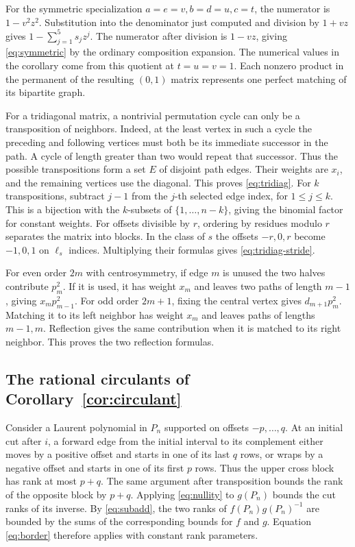 \documentclass[11pt,reqno]{amsart}
\theoremstyle{remark}
\numberwithin{equation}{section}
\begin{document}
For the symmetric specialization \(a=e=v,b=d=u,c=t\), the numerator is
\(1-v^2z^2\). Substitution into the denominator just computed and
division by \(1+vz\) gives \(1-\sum_{j=1}^5s_jz^j\). The numerator after
division is \(1-vz\), giving \eqref{eq:symmetric} by the ordinary
composition expansion. The numerical values in the corollary come from
this quotient at \(t=u=v=1\). Each nonzero product in the permanent of
the resulting \((0,1)\) matrix represents one perfect matching of its
bipartite graph.

For a tridiagonal matrix, a nontrivial permutation cycle can only be a
transposition of neighbors. Indeed, at the least vertex in such a cycle
the preceding and following vertices must both be its immediate successor
in the path. A cycle of length greater than two would repeat that
successor. Thus the possible transpositions form a set \(E\) of disjoint
path edges. Their weights are \(x_i\), and the remaining vertices use the
diagonal. This proves \eqref{eq:tridiag}. For \(k\) transpositions,
subtract \(j-1\) from the \(j\)-th selected edge index, for \(1\le j\le
k\). This is a bijection with the \(k\)-subsets of \(\{1,\ldots,n-k\}\),
giving the binomial factor for constant weights. For offsets divisible by
\(r\), ordering by residues modulo \(r\) separates the matrix into
blocks. In the class of \(s\) the offsets \(-r,0,r\) become \(-1,0,1\) on
\(\ell_s\) indices. Multiplying their formulas gives
\eqref{eq:tridiag-stride}.

For even order \(2m\) with centrosymmetry, if edge \(m\) is unused the
two halves contribute \(p_m^2\). If it is used, it has weight \(x_m\) and
leaves two paths of length \(m-1\), giving \(x_mp_{m-1}^2\). For odd
order \(2m+1\), fixing the central vertex gives \(d_{m+1}p_m^2\).
Matching it to its left neighbor has weight \(x_m\) and leaves paths of
lengths \(m-1,m\). Reflection gives the same contribution when it is
matched to its right neighbor. This proves the two reflection formulas.

\subsection{The rational circulants of Corollary~\ref{cor:circulant}}

Consider a Laurent polynomial in \(P_n\) supported on offsets
\(-p,\ldots,q\). At an initial cut after \(i\), a forward edge from the
initial interval to its complement either moves by a positive offset and
starts in one of its last \(q\) rows, or wraps by a negative offset and
starts in one of its first \(p\) rows. Thus the upper cross block has
rank at most \(p+q\). The same argument after transposition bounds the
rank of the opposite block by \(p+q\). Applying \eqref{eq:nullity} to
\(g(P_n)\) bounds the cut ranks of its inverse. By \eqref{eq:subadd}, the
two ranks of \(f(P_n)g(P_n)^{-1}\) are bounded by the sums of the
corresponding bounds for \(f\) and \(g\). Equation \eqref{eq:border}
therefore applies with constant rank parameters.
\end{document}
